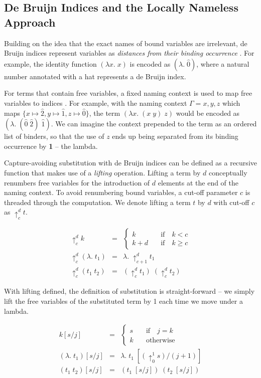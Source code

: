 \documentclass[]{unswthesis}
\let\i\textit
\let\b\textbf
\begin{document}
\subsection{De Bruijn Indices and the Locally Nameless Approach}
\label{sec:de-bruijn}

Building on the idea that the exact names of bound variables are irrelevant, de Bruijn indices represent variables as \i{distances from their binding occurrence} \cite{deBruijn72}. For example, the identity function $(\lambda x. \; x)$ is encoded as $(\lambda . \; \hat{0})$, where a natural number annotated with a hat represents a de Bruijn index.

For terms that contain free variables, a fixed naming context is used to map free variables to indices \cite{tapl}. For example, with the naming context $\Gamma = x, y, z$ which maps $\{x \mapsto \hat{2}, y \mapsto \hat{1}, z \mapsto \hat{0}\}$, the term $(\lambda x. \; (x \; y) \; z)$ would be encoded as $(\lambda. \; (\hat{0} \; \hat{2}) \; \hat{1})$. We can imagine the context prepended to the term as an ordered list of binders, so that the use of $z$ ends up being separated from its binding occurrence by \b{1} -- the lambda.

Capture-avoiding substitution with de Bruijn indices can be defined as a recursive function that makes use of a \i{lifting} operation. Lifting a term by $d$ conceptually renumbers free variables for the introduction of $d$ elements at the end of the naming context. To avoid renumbering bound variables, a cut-off parameter $c$ is threaded through the computation. We denote lifting a term $t$ by $d$ with cut-off $c$ as $\uparrow^d_c t$.

\begin{eqnarray*}
\uparrow^d_c k & = &
  \begin{cases}
  k \quad & \text{if} \quad k < c \\
  k + d \quad & \text{if} \quad k \geq c
  \end{cases}\\
\uparrow^d_c (\lambda. \; t_1) & = & \lambda. \; \uparrow^d_{c + 1} t_1\\
\uparrow^d_c (t_1 \; t_2) & = & (\uparrow^d_c t_1) \; (\uparrow^d_c t_2)
\end{eqnarray*}

With lifting defined, the definition of substitution is straight-forward -- we simply lift the free variables of the substituted term by 1 each time we move under a lambda.

\begin{eqnarray*}
k[s/j] & = &
  \begin{cases}
  s \quad & \text{if} \quad j = k \\
  k \quad & \text{otherwise}
  \end{cases}\\
(\lambda. \; t_1)\left[s/j\right] & = & \lambda. \; t_1 \; [(\uparrow^1_0 s)/(j + 1)]\\
(t_1 \; t_2)\left[s/j\right] & = & (t_1 \; [s/j]) \; (t_2 \; [s/j])
\end{eqnarray*}
\end{document}
